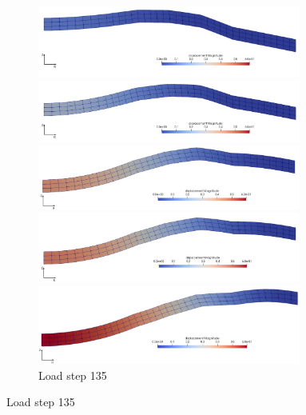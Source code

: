 \documentclass[11pt,a4paper,final]{article}
\begin{document}
\begin{figure}[ht!]
\centering
\begin{subfigure}[b]{0.49\textwidth}
\centering
\includegraphics[width=0.95\textwidth]{hooped_beam_ls_50.pdf}
\caption*{Load step 50}
\vspace{1cm}
\centering
\includegraphics[width=0.95\textwidth]{hooped_beam_ls_100.pdf}
\caption*{Load step 100}
\vspace{1cm}
\centering
\includegraphics[width=0.95\textwidth]{hooped_beam_ls_134.pdf}
\caption*{Load step 134}
\vspace{1cm}
\centering
\includegraphics[width=0.95\textwidth]{hooped_beam_ls_135.pdf}
\caption*{Load step 135}
\vspace{1cm}
\centering
\includegraphics[width=0.95\textwidth]{hooped_beam_ls_199.pdf}

\end{subfigure}
\end{figure}
\end{document}
